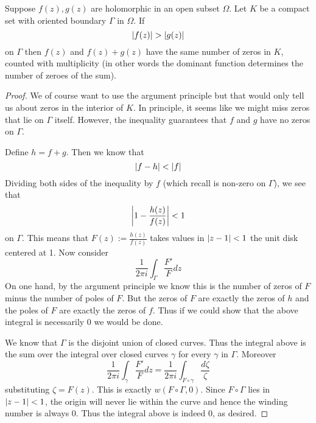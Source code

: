 \begin{theorem}
Suppose $f(z), g(z)$ are holomorphic in an open subset $\Omega$. Let $K$ be a compact set with oriented boundary $\Gamma$ in $\Omega$. If
$$ \left|f(z)\right| > \left|g(z)\right| $$
on $\Gamma$ then $f(z)$ and $f(z) + g(z)$ have the same number of zeros in $K$, counted with multiplicity (in other words the dominant function determines the number of zeroes of the sum).
\end{theorem}
\begin{proof}
We of course want to use the argument principle but that would only tell us about zeros in the interior of $K$. In principle, it seems like we might miss zeros that lie on $\Gamma$ itself. However, the inequality guarantees that $f$ and $g$ have no zeros on $\Gamma$.

Define $h = f + g$. Then we know that 
$$\left|f - h\right| < \left|f\right|$$
Dividing both sides of the inequality by $f$ (which recall is non-zero on $\Gamma$), we see that 
\begin{align*}
    \left|1 - \frac{h(z)}{f(z)}\right| < 1
\end{align*}
on $\Gamma$. This means that $F(z) := \frac{h(z)}{f(z)}$ takes values in $\left|z - 1\right| < 1$ the unit disk centered at 1. Now consider
$$ \frac{1}{2\pi i} \int_{\Gamma} \frac{F'}{F}dz $$
On one hand, by the argument principle we know this is the number of zeros of $F$ minus the number of poles of $F$. But the zeros of $F$ are exactly the zeros of $h$ and the poles of $F$ are exactly the zeros of $f$. Thus if we could show that the above integral is necessarily 0 we would be done.

We know that $\Gamma$ is the disjoint union of closed curves. Thus the integral above is the sum over the integral over closed curves $\gamma$ for every $\gamma$ in $\Gamma$. Moreover 
$$ \frac{1}{2\pi i} \int_\gamma \frac{F'}{F} dz = \frac{1}{2\pi i} \int_{F \circ \gamma} \frac{d\zeta}{\zeta} $$
substituting $\zeta = F(z)$. This is exactly $w(F \circ \Gamma, 0)$. Since $F \circ \Gamma$ lies in $\left|z - 1\right| < 1$, the origin will never lie within the curve and hence the winding number is always 0. Thus the integral above is indeed 0, as desired.   
\end{proof}